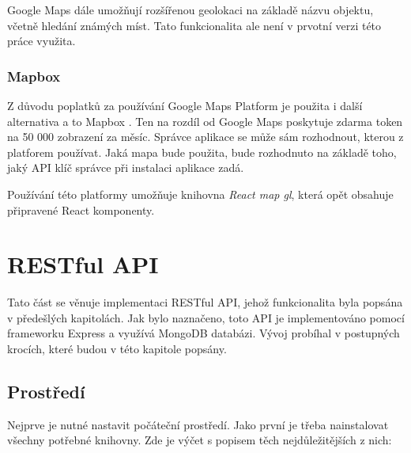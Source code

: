 \documentclass[thesis=M,czech]{FITthesis}[2018/10/20]
\begin{document}
	Google Maps dále umožňují rozšířenou geolokaci na základě názvu objektu, včetně hledání známých míst. Tato funkcionalita ale není v prvotní verzi této práce využita.
	
	\subsection{Mapbox}
Z důvodu poplatků za používání Google Maps Platform je použita i další alternativa a to Mapbox \cite{mapbox}. Ten na rozdíl od Google Maps poskytuje zdarma token na 50 000 zobrazení za měsíc. Správce aplikace se může sám rozhodnout, kterou z platforem používat. Jaká mapa bude použita, bude rozhodnuto na základě toho, jaký API klíč správce při instalaci aplikace zadá.

Používání této platformy umožňuje knihovna \textit{React map gl}, která opět obsahuje připravené React komponenty.
\chapter{RESTful API}
Tato část se věnuje implementaci RESTful API, jehož funkcionalita byla popsána v předešlých kapitolách. Jak bylo naznačeno, toto API je implementováno pomocí frameworku Express a využívá MongoDB databázi. Vývoj probíhal v postupných krocích, které budou v této kapitole popsány.
\section{Prostředí}
Nejprve je nutné nastavit počáteční prostředí. Jako první je třeba nainstalovat všechny potřebné knihovny. Zde je výčet s popisem těch nejdůležitějších z nich:
\end{document}
